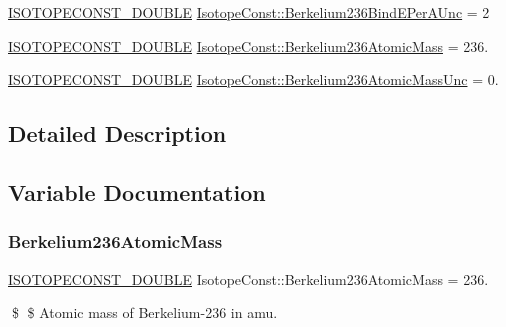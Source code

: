 \begin{DoxyCompactItemize}
\mbox{\hyperlink{group___isotope_const-_macros_ga8f45a7272ce02c0b4c65c44636ed719a}{I\+S\+O\+T\+O\+P\+E\+C\+O\+N\+S\+T\+\_\+\+D\+O\+U\+B\+LE}} \mbox{\hyperlink{group___isotope_const-_berkelium-_bk236_gae8cf4f01adcdb300a8d826aad77d5470}{Isotope\+Const\+::\+Berkelium236\+Bind\+E\+Per\+A\+Unc}} = 2
\item 
\mbox{\hyperlink{group___isotope_const-_macros_ga8f45a7272ce02c0b4c65c44636ed719a}{I\+S\+O\+T\+O\+P\+E\+C\+O\+N\+S\+T\+\_\+\+D\+O\+U\+B\+LE}} \mbox{\hyperlink{group___isotope_const-_berkelium-_bk236_ga2854ef03e05cdfb08d9d3d4003f8dd12}{Isotope\+Const\+::\+Berkelium236\+Atomic\+Mass}} = 236.
\item 
\mbox{\hyperlink{group___isotope_const-_macros_ga8f45a7272ce02c0b4c65c44636ed719a}{I\+S\+O\+T\+O\+P\+E\+C\+O\+N\+S\+T\+\_\+\+D\+O\+U\+B\+LE}} \mbox{\hyperlink{group___isotope_const-_berkelium-_bk236_ga92b82d69dc8da98eb5d52f5767b54fe4}{Isotope\+Const\+::\+Berkelium236\+Atomic\+Mass\+Unc}} = 0.
\end{DoxyCompactItemize}


\subsection{Detailed Description}


\subsection{Variable Documentation}
\mbox{\label{group___isotope_const-_berkelium-_bk236_ga2854ef03e05cdfb08d9d3d4003f8dd12}} 
\subsubsection{\texorpdfstring{Berkelium236\+Atomic\+Mass}{Berkelium236AtomicMass}}
{\footnotesize\ttfamily \mbox{\hyperlink{group___isotope_const-_macros_ga8f45a7272ce02c0b4c65c44636ed719a}{I\+S\+O\+T\+O\+P\+E\+C\+O\+N\+S\+T\+\_\+\+D\+O\+U\+B\+LE}} Isotope\+Const\+::\+Berkelium236\+Atomic\+Mass = 236.}

\$ \$ Atomic mass of Berkelium-\/236 in amu. \mbox{\label{group___isotope_const-_berkelium-_bk236_ga92b82d69dc8da98eb5d52f5767b54fe4}} 
